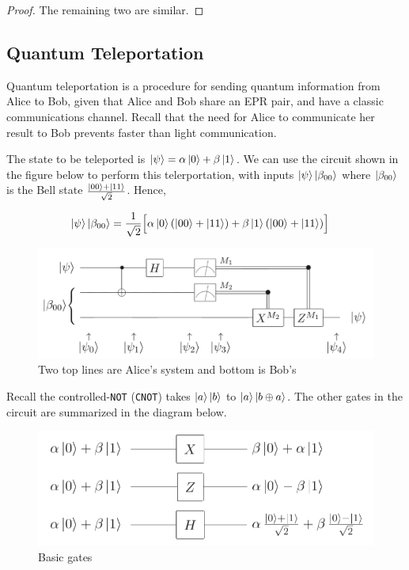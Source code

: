 \documentclass[main.tex]{subfiles}
\begin{document}
\begin{subappendices}
\begin{exercise}
\begin{proof}
The remaining two are similar.
\end{proof}	
\end{exercise}

\subsection{Quantum Teleportation}
Quantum teleportation is a procedure for sending quantum information from Alice to Bob, given that Alice and Bob share an EPR pair, and have a classic communications channel. Recall that the need for Alice to communicate her result to Bob prevents faster than light communication.

The state to be teleported is $\ket{\psi} = \alpha\ket{0} + \beta\ket{1}$. We can use the circuit shown in the figure below to perform this telerportation, with inputs $\ket{\psi} \ket{\beta_{00}}$ where $\ket{\beta_{00}}$ is the Bell state $\frac{\ket{00} + \ket{11} }{\sqrt{2}}$. Hence,

\begin{align*}
	\ket{\psi} \ket{\beta_{00}} &= \frac{1}{\sqrt{2}}\Big[\alpha\ket{0}(\ket{00} + \ket{11}) + \beta\ket{1}(\ket{00} + \ket{11})\Big]
\end{align*}


\begin{figure}[H]
\centering
\includegraphics[width=\linewidth]{images/teleportation_circuit.png}	
\caption{Two top lines are Alice's system and bottom is Bob's}
\end{figure}

Recall the controlled-\texttt{NOT} (\texttt{CNOT}) takes $\ket{a}\ket{b}$ to $\ket{a}\ket{b \oplus a}$. The other gates in the circuit are summarized in the diagram below.

\begin{figure}[H]
\centering
\includegraphics[width=0.5\linewidth]{images/basic_gates.png}	
\caption{Basic gates}
\end{figure}


\end{subappendices}
\end{document}
